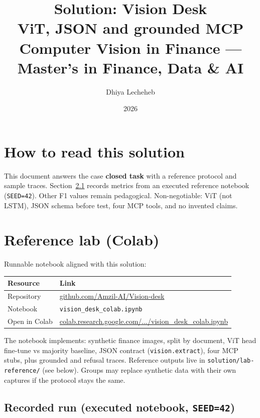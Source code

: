 \documentclass[11pt,a4paper]{article}
\title{%
  \textbf{Solution: Vision Desk}\\[0.35em]
  \large ViT, JSON and grounded MCP\\[0.5em]
  \normalsize Computer Vision in Finance --- Master's in Finance, Data \& AI
}
\author{Dhiya Lecheheb}
\date{2026}
\begin{document}
\maketitle
\thispagestyle{empty}

\section{How to read this solution}

This document answers the case \textbf{closed task} with a reference protocol
and sample traces. Section~\ref{sec:lab-run} records metrics from an executed
reference notebook (\texttt{SEED=42}). Other F1 values remain pedagogical.
Non-negotiable: ViT (not LSTM), JSON schema before test, four MCP tools,
and no invented claims.

\section{Reference lab (Colab)}

Runnable notebook aligned with this solution:

\begin{center}
\renewcommand{\arraystretch}{1.15}
\begin{tabular}{@{}p{3.2cm}p{11.4cm}@{}}
\toprule
\textbf{Resource} & \textbf{Link} \\
\midrule
Repository & \href{https://github.com/Amzil-AI/Vision-desk}{github.com/Amzil-AI/Vision-desk} \\
Notebook & \texttt{vision\_desk\_colab.ipynb} \\
Open in Colab & \href{https://colab.research.google.com/github/Amzil-AI/Vision-desk/blob/main/vision_desk_colab.ipynb}{colab.research.google.com/.../vision\_desk\_colab.ipynb} \\
\bottomrule
\end{tabular}
\end{center}

The notebook implements: synthetic finance images, split by document, ViT head
fine-tune vs majority baseline, JSON contract (\texttt{vision.extract}), four MCP
stubs, plus grounded and refusal traces. Reference outputs live in
\texttt{solution/lab-reference/} (see below). Groups may replace synthetic data with their
own captures if the protocol stays the same.

\subsection{Recorded run (executed notebook, \texttt{SEED=42})}
\label{sec:lab-run}
\end{document}

